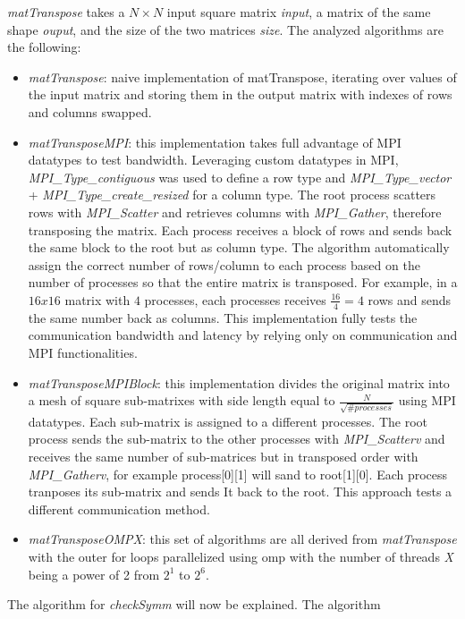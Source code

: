 \documentclass[conference]{IEEEtran}
\begin{document}
\textit{matTranspose} takes a $N \times N$ input square matrix
\textit{input}, a matrix of the same shape \textit{ouput}, and the
size of the two matrices \textit{size}. The analyzed algorithms are the following:
\begin{itemize}
\item \textit{matTranspose}: naive implementation of matTranspose,
iterating over values of the input matrix and storing them in the
output matrix with indexes of rows and columns swapped.
\item \textit{matTransposeMPI}: this implementation takes full advantage
  of MPI datatypes to test bandwidth. Leveraging 
  custom datatypes in MPI, \textit{MPI\_Type\_contiguous} was used
  to define a row type and \textit{MPI\_Type\_vector} + \textit{MPI\_Type\_create\_resized}
  for a column type. The root process scatters rows with \textit{MPI\_Scatter} and
  retrieves columns with \textit{MPI\_Gather}, therefore
  transposing the matrix. Each process receives a block of rows and
  sends back the same block to the root but as column type. The algorithm
  automatically assign the correct number of rows/column to each process based on the
  number of processes so that the entire matrix is transposed.
  For example, in a $16x16$ matrix with $4$ processes, each processes
  receives $\frac{16}{4}=4$ rows and sends the same number back as
  columns.
  This implementation fully tests the communication
  bandwidth and latency by relying only on communication and MPI
  functionalities.
\item \textit{matTransposeMPIBlock}: this implementation divides the
  original matrix into a mesh of square sub-matrixes with side length equal to
  $\frac{N}{\sqrt{\#processes}}$ using MPI datatypes. Each sub-matrix is assigned
  to a different processes. The root process sends the sub-matrix to the
  other processes with \textit{MPI\_Scatterv} and receives the same
  number of sub-matrices but in transposed order with \textit{MPI\_Gatherv},
  for example process[0][1] will sand to root[1][0].
  Each process tranposes its sub-matrix and sends It back to the root.
  This approach tests a different communication method.
\item \textit{matTransposeOMPX}: this set of algorithms are all derived
  from \textit{matTranspose} with the outer for loops parallelized using
  omp with the number of threads \textit{X} being a power of 2 from $2^1$ to $2^6$.
\end{itemize}
The algorithm for \textit{checkSymm} will now be explained. The algorithm
\end{document}
